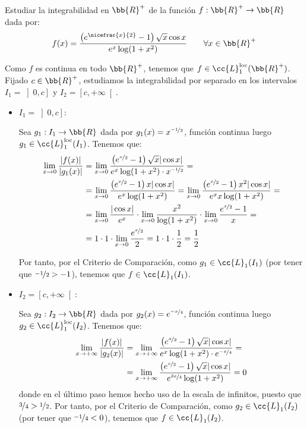 \begin{ejercicio}
    Estudiar la integrabilidad en $\bb{R}^+$ de la función $f:\bb{R}^+\to \bb{R}$ dada por:
    \begin{equation*}
        f(x) = \dfrac{\left(e^{\nicefrac{x}{2}} -1\right)\sqrt{x}\cos x}{e^x \log(1+x^2)}
        \qquad \forall x\in \bb{R}^+
    \end{equation*}

    Como $f$ es continua en todo $\bb{R}^+$, tenemos que $f\in \cc{L}_1^{\text{loc}}(\bb{R}^+)$.
    Fijado $c\in \bb{R}^+$, estudiamos la integrabilidad por separado en los intervalos $I_1=\left]0,c\right]$ y $I_2=\left[c,+\infty\right[$.
    \begin{itemize}
        \item \ul{$I_1=\left]0,c\right]$}:
        
        Sea $g_1:I_1\to \bb{R}$ dada por $g_1(x)=x^{\nicefrac{-1}{2}}$, función continua luego $g_1\in \cc{L}_1^{\text{loc}}(I_1)$. Tenemos que:
        \begin{align*}
            \lim_{x\to 0} \dfrac{|f(x)|}{|g_1(x)|}
            &= \lim_{x\to 0} \dfrac{\left(e^{\nicefrac{x}{2}} -1\right)\sqrt{x}|\cos x|}{e^x \log(1+x^2)\cdot x^{\nicefrac{-1}{2}}}
            =\\&= \lim_{x\to 0} \dfrac{\left(e^{\nicefrac{x}{2}} -1\right)x|\cos x|}{e^x \log(1+x^2)}
            = \lim_{x\to 0} \dfrac{\left(e^{\nicefrac{x}{2}} -1\right)x^2|\cos x|}{e^x x\log(1+x^2)} =\\
            &= \lim_{x\to 0} \dfrac{|\cos x|}{e^x} \cdot \lim_{x\to 0} \dfrac{x^2}{\log(1+x^2)} \cdot \lim_{x\to 0} \dfrac{e^{\nicefrac{x}{2}} -1}{x}=\\
            &= 1\cdot 1\cdot \lim_{x\to 0} \dfrac{e^{\nicefrac{x}{2}}}{2} = 1\cdot 1\cdot \dfrac{1}{2} = \dfrac{1}{2}
        \end{align*}

        Por tanto, por el Criterio de Comparación, como $g_1\in \cc{L}_1(I_1)$ (por tener que $\nicefrac{-1}{2}>-1$), tenemos que $f\in \cc{L}_1(I_1)$.

        \item \ul{$I_2=\left[c,+\infty\right[$}:
        
        Sea $g_2:I_2\to \bb{R}$ dada por $g_2(x)=e^{\nicefrac{-x}{4}}$, función continua luego $g_2\in \cc{L}_1^{\text{loc}}
        (I_2)$. Tenemos que:
        \begin{align*}
            \lim_{x\to +\infty} \dfrac{|f(x)|}{|g_2(x)|}
            &= \lim_{x\to +\infty} \dfrac{\left(e^{\nicefrac{x}{2}} -1\right)\sqrt{x}|\cos x|}{e^x \log(1+x^2)\cdot e^{\nicefrac{-x}{4}}}
            =\\&= \lim_{x\to +\infty} \dfrac{\left(e^{\nicefrac{x}{2}} -1\right)\sqrt{x}|\cos x|}{e^{\nicefrac{3x}{4}} \log(1+x^2)}
            = 0
        \end{align*}
        donde en el último paso hemos hecho uso de la escala de infinitos, puesto que $\nicefrac{3}{4}>\nicefrac{1}{2}$. Por tanto, por el Criterio de Comparación, como $g_2\in \cc{L}_1(I_2)$ (por tener que $\nicefrac{-1}{4}<0$), tenemos que $f\in \cc{L}_1(I_2)$.
    \end{itemize}
\end{ejercicio}

